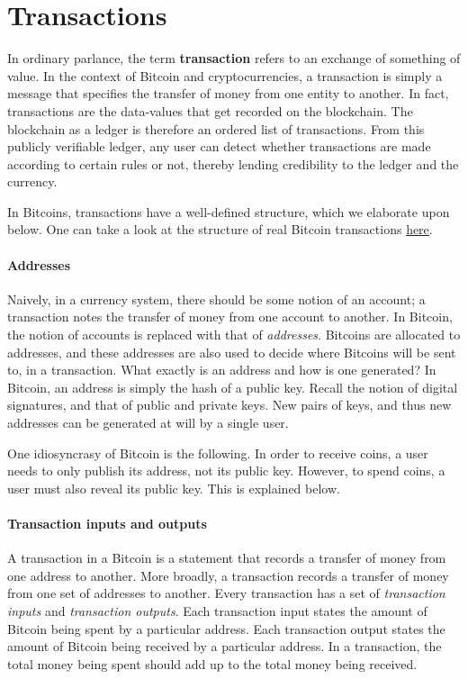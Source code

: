 \documentclass{article}
\begin{document}
\section*{Transactions}
In ordinary parlance, the term \textbf{transaction} refers to an exchange of something of value. In the context of Bitcoin and cryptocurrencies, a transaction is simply a message that specifies the transfer of money from one entity to another. In fact, transactions are the data-values that get recorded on the blockchain. The blockchain as a ledger is therefore an ordered list of transactions. From this publicly verifiable ledger, any user can detect whether transactions are made according to certain rules or not, thereby lending credibility to the ledger and the currency.

In Bitcoins, transactions have a well-defined structure, which we elaborate upon below. One can take a look at the structure of real Bitcoin transactions \href{https://www.blockchain.com/explorer}{here}.

\paragraph{Addresses}
Naively, in a currency system, there should be some notion of an account; a transaction notes the transfer of money from one account to another. In Bitcoin, the notion of accounts is replaced with that of \textit{addresses}. Bitcoins are allocated to addresses, and these addresses are also used to decide where Bitcoins will be sent to, in a transaction. What exactly is an address and how is one generated? In Bitcoin, an address is simply the hash of a public key. Recall the notion of digital signatures, and that of public and private keys. New pairs of keys, and thus new addresses can be generated at will by a single user.

One idiosyncrasy of Bitcoin is the following. In order to receive coins, a user needs to only publish its address, not its public key. However, to spend coins, a user must also reveal its public key. This is explained below.

\paragraph{Transaction inputs and outputs}
A transaction in a Bitcoin is a statement that records a transfer of money from one address to another. More broadly, a transaction records a transfer of money from one set of addresses to another. Every transaction has a set of \textit{transaction inputs} and \textit{transaction outputs}. Each transaction input states the amount of Bitcoin being spent by a particular address. Each transaction output states the amount of Bitcoin being received by a particular address. In a transaction, the total money being spent should add up to the total money being received. %
\end{document}
